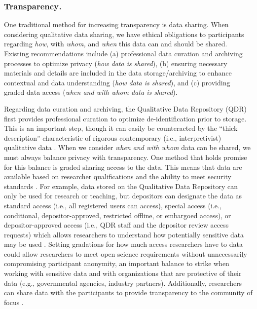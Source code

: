 \documentclass[authordate, meta]{jote-new-article}
\begin{document}
\subsubsection{Transparency\emph{. }}



One traditional method for increasing transparency is data sharing. When considering qualitative data sharing, we have ethical obligations to participants regarding \emph{how}, with \emph{whom, }and \emph{when} this data can and should be shared. Existing recommendations include (a) professional data curation and archiving processes to optimize privacy (\emph{how data is shared}), (b) ensuring necessary materials and details are included in the data storage/archiving to enhance contextual and data understanding (\emph{how data is shared}), and (c) providing graded data access (\emph{when and with whom data is shared}).



Regarding data curation and archiving, the Qualitative Data Repository (QDR) first provides professional curation to optimize de-identification prior to storage. This is an important step, though it can easily be counteracted by the “thick description” characteristic of rigorous contemporary (i.e., interpretivist) qualitative data \parencites{Geertz1973}. When we consider \emph{when and with whom} data can be shared, we must always balance privacy with transparency. One method that holds promise for this balance is graded sharing access to the data. This means that data are available based on researcher qualifications \parencites[e.g.][]{ICPSRND} and the ability to meet security standards \parencites[e.g.][]{ICPSRND}{QualitativeDataRepository2022}. For example, data stored on the Qualitative Data Repository can only be used for research or teaching, but depositors can designate the data as standard access (i.e., all registered users can access), special access (i.e., conditional, depositor-approved, restricted offline, or embargoed access), or depositor-approved access (i.e., QDR staff and the depositor review access requests) which allows researchers to understand how potentially sensitive data may be used \parencites{AccessControls2020}. Setting gradations for how much access researchers have to data could allow researchers to meet open science requirements without unnecessarily compromising participant anonymity, an important balance to strike when working with sensitive data and with organizations that are protective of their data (e.g., governmental agencies, industry partners). Additionally, researchers can share data with the participants to provide transparency to the community of focus \parencites{Humphreys2021}.
\end{document}
